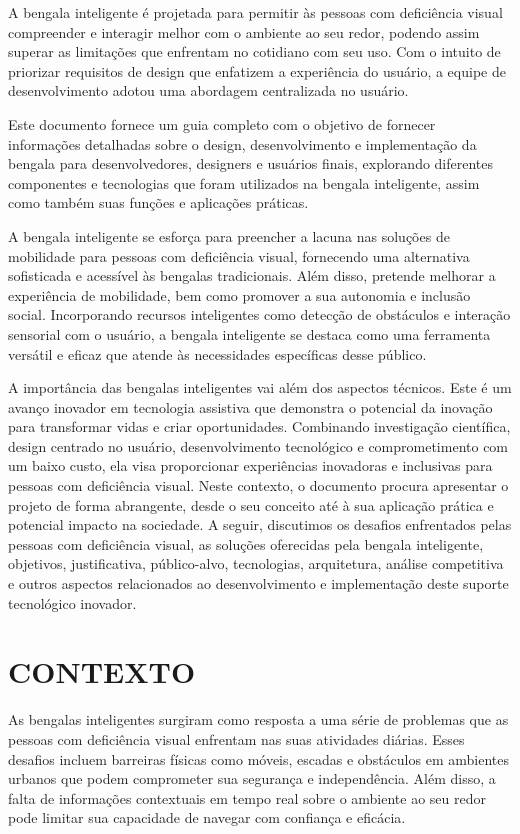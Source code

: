 A bengala inteligente é projetada para permitir às pessoas com deficiência visual compreender e interagir melhor com o ambiente ao seu redor, podendo assim superar as limitações que enfrentam no cotidiano com seu uso. Com o intuito de priorizar requisitos de design que enfatizem a experiência do usuário, a equipe de desenvolvimento adotou uma abordagem centralizada no usuário.

Este documento fornece um guia completo com o objetivo de fornecer informações detalhadas sobre o design, desenvolvimento e implementação da bengala para desenvolvedores, designers e usuários finais, explorando diferentes componentes e tecnologias que foram utilizados na bengala inteligente, assim como também suas funções e aplicações práticas.

A bengala inteligente se esforça para preencher a lacuna nas soluções de mobilidade para pessoas com deficiência visual, fornecendo uma alternativa sofisticada e acessível às bengalas tradicionais. Além disso, pretende melhorar a experiência de mobilidade, bem como promover a sua autonomia e inclusão social. Incorporando recursos inteligentes como detecção de obstáculos e interação sensorial com o usuário, a bengala inteligente se destaca como uma ferramenta versátil e eficaz que atende às necessidades específicas desse público.

A importância das bengalas inteligentes vai além dos aspectos técnicos. Este é um avanço inovador em tecnologia assistiva que demonstra o potencial da inovação para transformar vidas e criar oportunidades. Combinando investigação científica, design centrado no usuário, desenvolvimento tecnológico e comprometimento com um baixo custo, ela visa proporcionar experiências inovadoras e inclusivas para pessoas com deficiência visual. Neste contexto, o documento procura apresentar o projeto de forma abrangente, desde o seu conceito até à sua aplicação prática e potencial impacto na sociedade. A seguir, discutimos os desafios enfrentados pelas pessoas com deficiência visual, as soluções oferecidas pela bengala inteligente, objetivos, justificativa, público-alvo, tecnologias, arquitetura, análise competitiva e outros aspectos relacionados ao desenvolvimento e implementação deste suporte tecnológico inovador.



\section{CONTEXTO}
As bengalas inteligentes surgiram como resposta a uma série de problemas que as pessoas com deficiência visual enfrentam nas suas atividades diárias. Esses desafios incluem barreiras físicas como móveis, escadas e obstáculos em ambientes urbanos que podem comprometer sua segurança e independência. Além disso, a falta de informações contextuais em tempo real sobre o ambiente ao seu redor pode limitar sua capacidade de navegar com confiança e eficácia.

